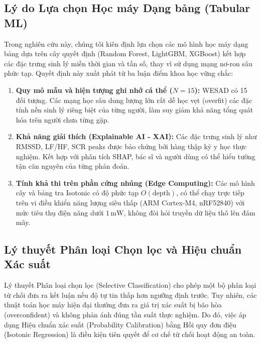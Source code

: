\documentclass[conference]{IEEEtran}
\begin{document}
\subsection{Lý do Lựa chọn Học máy Dạng bảng (Tabular ML)}
Trong nghiên cứu này, chúng tôi kiên định lựa chọn các mô hình học máy dạng bảng dựa trên cây quyết định (Random Forest, LightGBM, XGBoost) kết hợp các đặc trưng sinh lý miền thời gian và tần số, thay vì sử dụng mạng nơ-ron sâu phức tạp. Quyết định này xuất phát từ ba luận điểm khoa học vững chắc:
\begin{enumerate}
    \item \textbf{Quy mô mẫu và hiện tượng ghi nhớ cá thể ($N=15$):} WESAD có 15 đối tượng. Các mạng học sâu dung lượng lớn rất dễ học vẹt (overfit) các đặc tính nền sinh lý riêng biệt của từng người, làm suy giảm khả năng tổng quát hóa trên người chưa từng gặp.
    \item \textbf{Khả năng giải thích (Explainable AI - XAI):} Các đặc trưng sinh lý như RMSSD, LF/HF, SCR peaks được bảo chứng bởi hàng thập kỷ y học thực nghiệm. Kết hợp với phân tích SHAP, bác sĩ và người dùng có thể hiểu tường tận căn nguyên của từng phán đoán.
    \item \textbf{Tính khả thi trên phần cứng nhúng (Edge Computing):} Các mô hình cây và bảng tra Isotonic có độ phức tạp $O(\text{depth})$, có thể chạy trực tiếp trên vi điều khiển năng lượng siêu thấp (ARM Cortex-M4, nRF52840) với mức tiêu thụ điện năng dưới $1\,\text{mW}$, không đòi hỏi truyền dữ liệu thô lên đám mây.
\end{enumerate}

\subsection{Lý thuyết Phân loại Chọn lọc và Hiệu chuẩn Xác suất}
Lý thuyết Phân loại chọn lọc (Selective Classification) \cite{geifman2017selective, cortes2016learning} cho phép một bộ phân loại từ chối đưa ra kết luận nếu độ tự tin thấp hơn ngưỡng định trước. Tuy nhiên, các thuật toán học máy hiện đại thường đưa ra giá trị xác suất bị bão hòa (overconfident) và không phản ánh đúng tần suất thực nghiệm. Do đó, việc áp dụng Hiệu chuẩn xác suất (Probability Calibration) bằng Hồi quy đơn điệu (Isotonic Regression) \cite{niculescu2005predicting} là điều kiện tiên quyết để cơ chế từ chối hoạt động an toàn.

\end{document}
